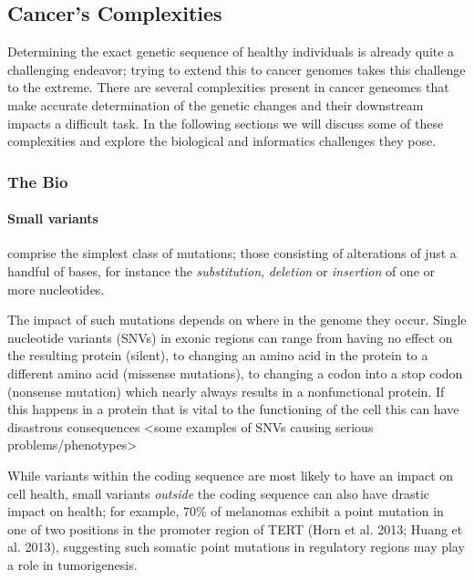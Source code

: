 \subsection{Cancer's Complexities}

Determining the exact genetic sequence of healthy individuals is already quite a challenging endeavor; trying to extend this to cancer genomes takes this challenge to the extreme. There are several complexities present in cancer geneomes that make accurate determination of the genetic changes and their downstream impacts a difficult task. In the following sections we will discuss some of these complexities and explore the biological and informatics challenges they pose.

\subsubsection{The Bio}
\paragraph{Small variants} comprise the simplest class of mutations; those consisting of alterations of just a handful of bases, for instance the \emph{substitution}, \emph{deletion} or \emph{insertion} of one or more nucleotides.

The impact of such mutations depends on where in the genome they occur. Single nucleotide variants (SNVs) in exonic regions can range from having no effect on the resulting protein (silent), to changing an amino acid in the protein to a different amino acid (missense mutations), to changing a codon into a stop codon (nonsense mutation) which nearly always results in a nonfunctional protein. If this happens in a protein that is vital to the functioning of the cell this can have disastrous consequences <some examples of SNVs causing serious problems/phenotypes>

While variants within the coding sequence are most likely to have an impact on cell health, small variants \emph{outside} the coding sequence can also have drastic impact on health; for example, 70\% of melanomas exhibit a point mutation in one of two positions in the promoter region of TERT (Horn et al. 2013; Huang et al. 2013), suggesting such somatic point mutations in regulatory regions may play a role in tumorigenesis.

